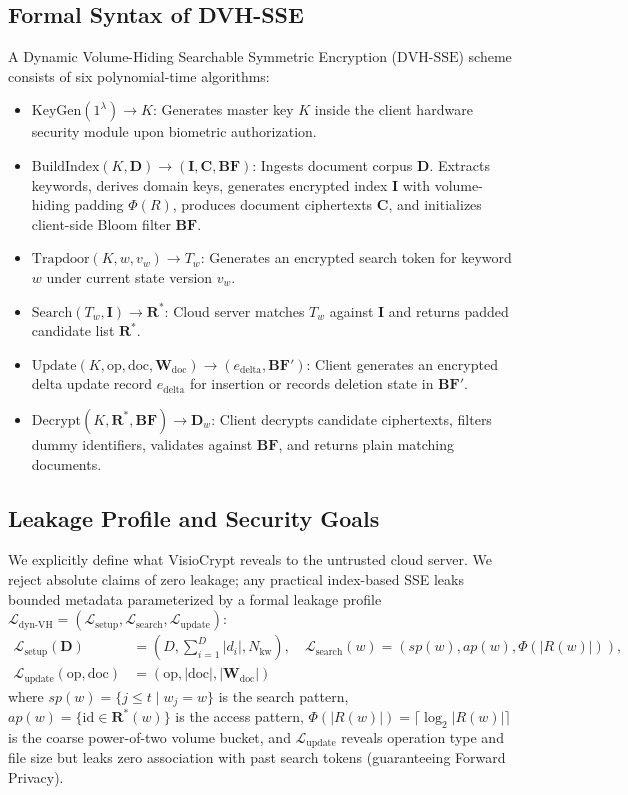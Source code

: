 \documentclass[10pt,conference]{IEEEtran}
\newenvironment{revised}{\color{revcolor}}{}
\begin{document}
\begin{revised}
\subsection{Formal Syntax of DVH-SSE}
A Dynamic Volume-Hiding Searchable Symmetric Encryption ($\text{DVH-SSE}$) scheme consists of six polynomial-time algorithms:
\begin{itemize}
    \item $\text{KeyGen}(1^\lambda) \to K$: Generates master key $K$ inside the client hardware security module upon biometric authorization.
    \item $\text{BuildIndex}(K, \mathbf{D}) \to (\mathbf{I}, \mathbf{C}, \mathbf{BF})$: Ingests document corpus $\mathbf{D}$. Extracts keywords, derives domain keys, generates encrypted index $\mathbf{I}$ with volume-hiding padding $\Phi(R)$, produces document ciphertexts $\mathbf{C}$, and initializes client-side Bloom filter $\mathbf{BF}$.
    \item $\text{Trapdoor}(K, w, v_w) \to T_w$: Generates an encrypted search token for keyword $w$ under current state version $v_w$.
    \item $\text{Search}(T_w, \mathbf{I}) \to \mathbf{R}^*$: Cloud server matches $T_w$ against $\mathbf{I}$ and returns padded candidate list $\mathbf{R}^*$.
    \item $\text{Update}(K, \text{op}, \text{doc}, \mathbf{W}_{\text{doc}}) \to (e_{\text{delta}}, \mathbf{BF}')$: Client generates an encrypted delta update record $e_{\text{delta}}$ for insertion or records deletion state in $\mathbf{BF}'$.
    \item $\text{Decrypt}(K, \mathbf{R}^*, \mathbf{BF}) \to \mathbf{D}_w$: Client decrypts candidate ciphertexts, filters dummy identifiers, validates against $\mathbf{BF}$, and returns plain matching documents.
\end{itemize}

\subsection{Leakage Profile and Security Goals}
We explicitly define what VisioCrypt reveals to the untrusted cloud server. We reject absolute claims of zero leakage; any practical index-based SSE leaks bounded metadata parameterized by a formal leakage profile $\mathcal{L}_{\text{dyn-VH}} = (\mathcal{L}_{\text{setup}}, \mathcal{L}_{\text{search}}, \mathcal{L}_{\text{update}})$:
\begin{align}
\mathcal{L}_{\text{setup}}(\mathbf{D}) &= (D, \textstyle\sum_{i=1}^D |d_i|, N_{\text{kw}}), \quad
\mathcal{L}_{\text{search}}(w) = (sp(w), ap(w), \Phi(|R(w)|)), \nonumber \\
\mathcal{L}_{\text{update}}(\text{op}, \text{doc}) &= (\text{op}, |\text{doc}|, |\mathbf{W}_{\text{doc}}|)
\end{align}
where $sp(w) = \{ j \le t \mid w_j = w \}$ is the search pattern, $ap(w) = \{ \text{id} \in \mathbf{R}^*(w) \}$ is the access pattern, $\Phi(|R(w)|) = \lceil \log_2 |R(w)| \rceil$ is the coarse power-of-two volume bucket, and $\mathcal{L}_{\text{update}}$ reveals operation type and file size but leaks zero association with past search tokens (guaranteeing Forward Privacy).


\end{revised}
\end{document}
